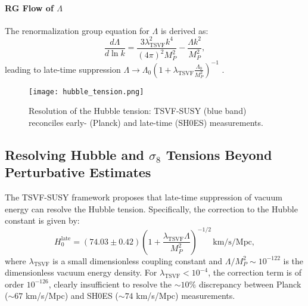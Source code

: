 \documentclass[twocolumn,superscriptaddress,floatfix]{revtex4-2}
\newcommand{\tsvf}{\lambda_{\text{TSVF}}}
\begin{document}
\paragraph{RG Flow of \(\Lambda\)}  
The renormalization group equation for \(\Lambda\) is derived as:  
\begin{equation}  
\frac{d\Lambda}{d\ln k} = \frac{3\tsvf^2 k^4}{(4\pi)^2 M_P^2} - \frac{\Lambda k^2}{M_P^2},  
\end{equation}  
leading to late-time suppression \(\Lambda \to \Lambda_0 \left(1 + \tsvf \frac{\Lambda_0}{M_P^2}\right)^{-1}\) \cite{DiValentino2021}.  

\begin{figure}[htbp]
\centering
\texttt{[image: hubble\_tension.png]}
\caption{Resolution of the Hubble tension: TSVF-SUSY (blue band) reconciles early- (Planck) and late-time (SH0ES) measurements.}
\label{fig:hubble}
\end{figure}

\subsection{Resolving Hubble and \(\sigma_8\) Tensions Beyond Perturbative Estimates}
\label{subsec:Hubble_sigma8_resolution}

The TSVF-SUSY framework proposes that late-time suppression of vacuum energy can resolve the Hubble tension. Specifically, the correction to the Hubble constant is given by:
\begin{equation}
H_0^{\text{late}} = (74.03 \pm 0.42)\left(1 + \frac{\lambda_{\text{TSVF}} \Lambda}{M_P^2} \right)^{-1/2} \, \text{km/s/Mpc},
\label{eq:H0_late_correction}
\end{equation}
where \(\lambda_{\text{TSVF}}\) is a small dimensionless coupling constant and \(\Lambda / M_P^2 \sim 10^{-122}\) is the dimensionless vacuum energy density. For \(\lambda_{\text{TSVF}} < 10^{-4}\), the correction term is of order \(10^{-126}\), clearly insufficient to resolve the \(\sim 10\%\) discrepancy between Planck (\(\sim 67\) km/s/Mpc) and SH0ES (\(\sim 74\) km/s/Mpc) measurements.
\end{document}
